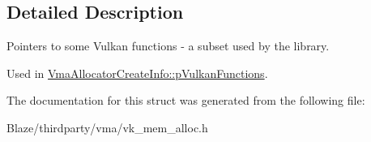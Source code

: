 \subsection{Detailed Description}
Pointers to some Vulkan functions -\/ a subset used by the library. 

Used in \hyperlink{structVmaAllocatorCreateInfo_a3dc197be3227da7338b1643f70db36bd}{Vma\+Allocator\+Create\+Info\+::p\+Vulkan\+Functions}. 

The documentation for this struct was generated from the following file\+:\begin{DoxyCompactItemize}
\item 
Blaze/thirdparty/vma/vk\+\_\+mem\+\_\+alloc.\+h\end{DoxyCompactItemize}
